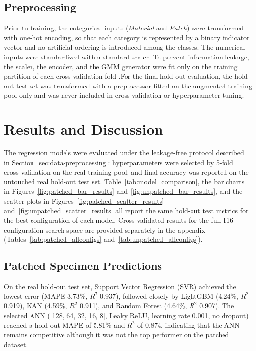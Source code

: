 \documentclass[journal,article,submit,pdftex,moreauthors]{Definitions/mdpi}
\begin{document}
\subsection{Preprocessing}
Prior to training, the categorical inputs (\textit{Material} and \textit{Patch}) were transformed with one-hot encoding, so that each category is represented by a binary indicator vector and no artificial ordering is introduced among the classes. The numerical inputs were standardized with a standard scaler. To prevent information leakage, the scaler, the encoder, and the GMM generator were fit only on the training partition of each cross-validation fold \cite{schober2021statistics, pedregosa2011scikit}.For the final hold-out evaluation, the hold-out test set was transformed with a preprocessor fitted on the augmented training pool only and was never included in cross-validation or hyperparameter tuning.


\section{Results and Discussion}\label{sec:results-discussion}

The regression models were evaluated under the leakage-free protocol described in Section~\ref{sec:data-preprocessing}: hyperparameters were selected by 5-fold cross-validation on the real training pool, and final accuracy was reported on the untouched real hold-out test set. Table~\ref{tab:model_comparison}, the bar charts in Figures~\ref{fig:patched_bar_results} and~\ref{fig:unpatched_bar_results}, and the scatter plots in Figures~\ref{fig:patched_scatter_results} and~\ref{fig:unpatched_scatter_results} all report the same hold-out test metrics for the best configuration of each model. Cross-validated results for the full 116-configuration search space are provided separately in the appendix (Tables~\ref{tab:patched_allconfigs} and~\ref{tab:unpatched_allconfigs}).


\subsection{Patched Specimen Predictions}
On the real hold-out test set, Support Vector Regression (SVR) achieved the lowest error (MAPE 3.73\%, $R^2$ 0.937), followed closely by LightGBM (4.24\%, $R^2$ 0.919), KAN (4.59\%, $R^2$ 0.911), and Random Forest (4.64\%, $R^2$ 0.907). The selected ANN ([128, 64, 32, 16, 8], Leaky ReLU, learning rate 0.001, no dropout) reached a hold-out MAPE of 5.81\% and $R^2$ of 0.874, indicating that the ANN remains competitive although it was not the top performer on the patched dataset.
\end{document}
